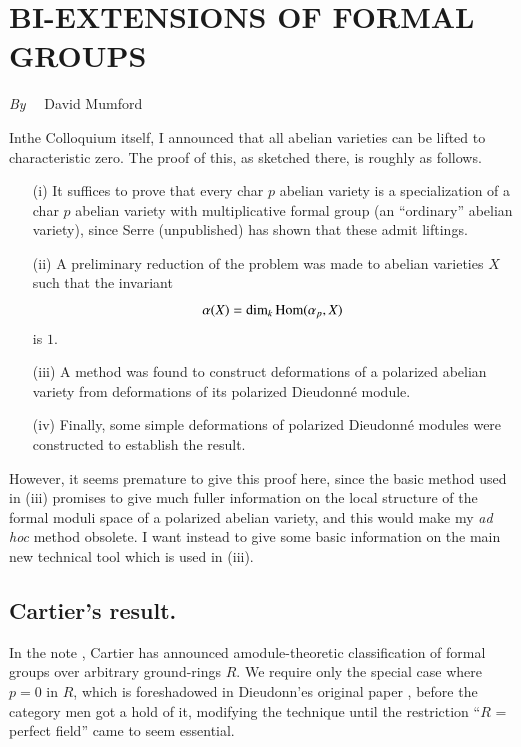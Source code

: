 \chapter[\textsc{D. Mumford~:} Bi-Extensions of Formal Groups]{BI-EXTENSIONS OF FORMAL GROUPS}\label{art15}

\begin{center}
{\em By}~~ David Mumford
\end{center}


\setcounter{pageoriginal}{306}
In\pageoriginale the Colloquium itself, I announced that all abelian varieties can be lifted to characteristic zero. The proof of this, as sketched there, is roughly as follows.
\begin{itemize}
\item[(i)] It suffices to prove that every char $p$ abelian variety is a specialization of a char $p$ abelian variety with multiplicative formal group (an ``ordinary'' abelian variety), since Serre (unpublished) has shown that these admit liftings.

\item[(ii)] A preliminary reduction of the problem was made to abelian varieties $X$ such that the invariant
$$
\alpha(X)=\dim_{k}\operatorname{\mathrm{Hom}} (\alpha_{p},X)
$$
is $1$.

\item[(iii)] A method was found to construct deformations of a polarized abelian variety from deformations of its polarized Dieudonn\'e module.

\item[(iv)] Finally, some simple deformations of polarized Dieudonn\'e modules were constructed to establish the result.
\end{itemize}

However, it seems premature to give this proof here, since the basic method used in (iii) promises to give much fuller information on the local structure of the formal moduli space of a polarized abelian variety, and this would make my {\em ad hoc} method obsolete. I want instead to give some basic information on the main new technical tool which is used in (iii).

\section{Cartier's result.}\label{art15-sec1}

In the note \cite{art15-key1}, Cartier has announced a\break module-theoretic classification of formal groups over arbitrary ground-rings $R$. We require only the special case where $p=0$ in $R$, which is foreshadowed in Dieudonn'es original paper \cite{art15-key2}, before the category men got a hold of it, modifying the technique until the restriction ``$R$ = perfect field'' came to seem essential.

